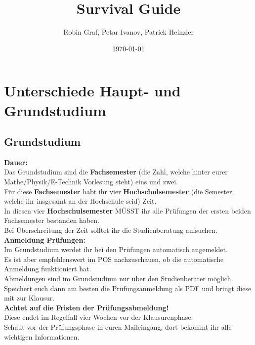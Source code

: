 \documentclass[11pt, a4paper, oneside]{book}
\author{Robin Graf, Petar Ivanov, Patrick Heinzler}
\title{Survival Guide}
\date{\today}
\begin{document}
\maketitle

\tableofcontents



\chapter{Unterschiede Haupt- und Grundstudium}


%


\section{Grundstudium}

\textbf{Dauer:}\\
Das Grundstudium sind die \textbf{Fachsemester} (die Zahl, welche hinter eurer Mathe/Physik/E-Technik Vorlesung steht) eins und zwei.\\
Für diese \textbf{Fachsemester} habt ihr vier \textbf{Hochschulsemester} (die Semester, welche ihr insgesamt an der Hochschule seid) Zeit.\\
In diesen vier \textbf{Hochschulsemester} MÜSST ihr alle Prüfungen der ersten beiden Fachsemester bestanden haben.\\
Bei Überschreitung der Zeit solltet ihr die Studienberatung aufsuchen.\\

\textbf{Anmeldung Prüfungen:}\\
Im Grundstudium werdet ihr bei den Prüfungen automatisch angemeldet.\\
Es ist aber empfehlenswert im POS nachzuschauen, ob die automatische Anmeldung funktioniert hat.\\
Abmeldungen sind im Grundstudium nur über den Studienberater möglich.\\
Speichert euch dann am besten die Prüfungsanmeldung als PDF und bringt diese mit zur Klausur.\\
\textbf{Achtet auf die Fristen der Prüfungsabmeldung!}\\ %
Diese endet im Regelfall vier Wochen vor der Klausurenphase.\\
Schaut vor der Prüfungsphase in euren Maileingang, dort bekommt ihr alle wichtigen Informationen.\\
\end{document}
